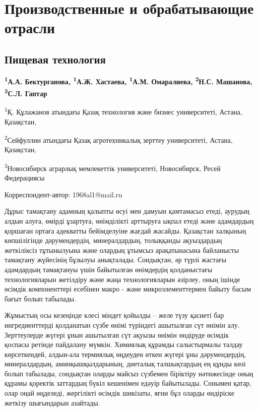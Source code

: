 \newpage
\let\cleardoublepage\clearpage
\part{Производственные и обрабатывающие отрасли}
\chapter{Пищевая технология}

\begin{articleheader}

{\bfseries
\textsuperscript{1}А.А. Бектурганова\textsuperscript{\envelope },
\textsuperscript{1}А.Ж. Хастаева,
\textsuperscript{1}А.М. Омаралиева,
\textsuperscript{2}Н.С. Машанова,
\textsuperscript{3}С.Л. Гаптар
}
\end{articleheader}

\begin{affiliation}
\textsuperscript{1}Қ. Құлажанов атындағы Қазақ технология және бизнес университеті, Астана, Қазақстан,

\textsuperscript{2}Сейфуллин атындағы Қазақ агротехникалық зерттеу университеті, Астана, Қазақстан,

\textsuperscript{3}Новосибирск аграрлық мемлекеттік университеті, Новосибирск, Ресей Федерациясы

\raggedright \textsuperscript{\envelope }Корреспондент-автор: 1968al1@mail.ru
\end{affiliation}

Дұрыс тамақтану адамның қалыпты өсуі мен дамуын қамтамасыз етеді,
аурудың алдын алуға, өмірді ұзартуға, өнімділікті арттыруға ықпал етеді
және адамдардың қоршаған ортаға адекватты бейімделуіне жағдай жасайды.
Қазақстан халқының көпшілігінде дәрумендердің, минералдардың, толыққанды
ақуыздардың жеткіліксіз тұтынылуына және олардың ұтымсыз арақатынасына
байланысты тамақтану жүйесінің бұзылуы анықталады. Сондықтан, әр түрлі
жастағы адамдардың тамақтануы үшін байытылған өнімдердің қолданыстағы
технологияларын жетілдіру және жаңа технологияларын әзірлеу, оның ішінде
өсімдік компоненттері есебінен макро - және микроэлементтермен байыту
басым бағыт болып табылады.

Жұмыстың осы кезеңінде клесі міндет қойылды -- желе түзу қасиеті бар
ингредиенттерді қолданатын сүзбе өнімі түріндегі ашытылған сүт өнімін
алу. Зерттеулерде жүгері ұнын ашытылған сүт ақуызы өнімін өндіруде
өсімдік қоспасы ретінде пайдалану мүмкін. Химиялық құрамды салыстырмалы
талдау көрсеткендей, алдын-ала термиялық өңдеуден өткен жүгері ұны
дәрумендердің, минералдардың, аминқышқылдарының, диеталық талшықтардың
ең құнды көзі болып табылады, сондықтан оларды майсыз сүзбемен біріктіру
нәтижесінде оның құрамы қоректік заттардың бүкіл кешенімен едәуір
байытылады. Сонымен қатар, олар оңай өңделеді, жергілікті өсімдік
шикізаты, яғни бұл оларды өндіріске жеткізу шығындарын азайтады.

